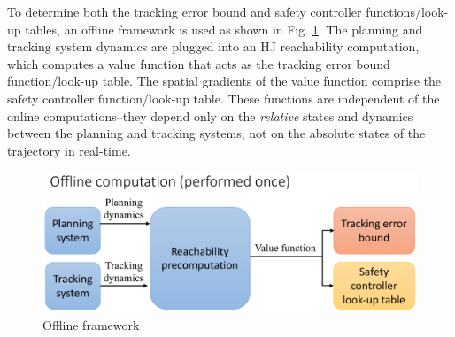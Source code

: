 To determine both the tracking error bound and safety controller functions/look-up tables, an offline framework is used as shown in Fig. \ref{fig:fw_offline}. The planning and tracking system dynamics are plugged into an HJ reachability computation, which computes a value function that acts as the tracking error bound function/look-up table. The spatial gradients of the value function comprise the safety controller function/look-up table. These functions are independent of the online computations--they depend only on the \textit{relative} states and dynamics between the planning and tracking systems, not on the absolute states of the trajectory in real-time.
\begin{figure}[h!]
	\includegraphics[width=\columnwidth]{fig/framework_offline}
	\caption{Offline framework}
	\label{fig:fw_offline}
\end{figure}

